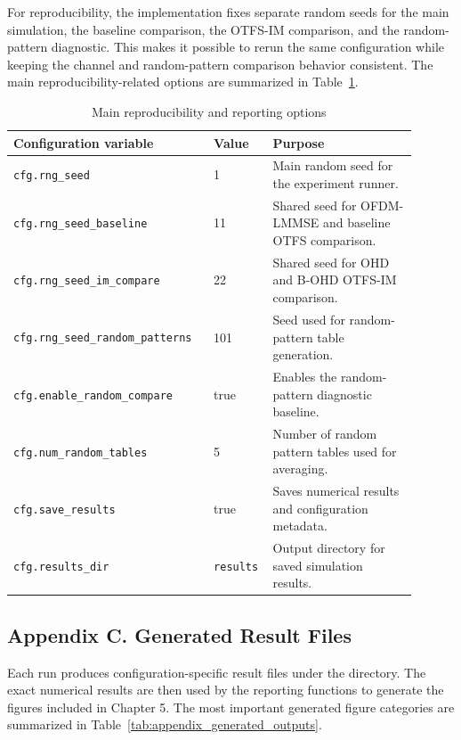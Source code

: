For reproducibility, the implementation fixes separate random seeds for the main simulation, the baseline comparison, the OTFS-IM comparison, and the random-pattern diagnostic. This makes it possible to rerun the same configuration while keeping the channel and random-pattern comparison behavior consistent. The main reproducibility-related options are summarized in Table~\ref{tab:appendix_reproducibility_options}.

\begin{table}[H]
\centering
\caption{Main reproducibility and reporting options}
\label{tab:appendix_reproducibility_options}
\footnotesize
\setlength{\tabcolsep}{3pt}
\begin{tabular}{|p{0.46\linewidth}|p{0.10\linewidth}|p{0.34\linewidth}|}
\hline
\textbf{Configuration variable} & \textbf{Value} & \textbf{Purpose} \\
\hline
\texttt{cfg.rng\_seed} & 1 & Main random seed for the experiment runner. \\
\hline
\texttt{cfg.rng\_seed\_baseline} & 11 & Shared seed for OFDM-LMMSE and baseline OTFS comparison. \\
\hline
\texttt{cfg.rng\_seed\_im\_compare} & 22 & Shared seed for OHD and B-OHD OTFS-IM comparison. \\
\hline
\texttt{cfg.rng\_seed\_random\_patterns} & 101 & Seed used for random-pattern table generation. \\
\hline
\texttt{cfg.enable\_random\_compare} & true & Enables the random-pattern diagnostic baseline. \\
\hline
\texttt{cfg.num\_random\_tables} & 5 & Number of random pattern tables used for averaging. \\
\hline
\texttt{cfg.save\_results} & true & Saves numerical results and configuration metadata. \\
\hline
\texttt{cfg.results\_dir} & \texttt{results} & Output directory for saved simulation results. \\
\hline
\end{tabular}
\end{table}

\subsection*{Appendix C. Generated Result Files}

Each run produces configuration-specific result files under the  directory. The exact numerical results are then used by the reporting functions to generate the figures included in Chapter 5. The most important generated figure categories are summarized in Table~\ref{tab:appendix_generated_outputs}.

